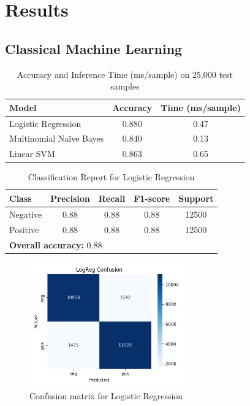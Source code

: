 \documentclass[12pt,a4paper]{article}
\begin{document}
\section{Results}
\subsection{Classical Machine Learning}

\begin{table}[H]
  \centering
  \caption{Accuracy and Inference Time (ms/sample) on 25,000 test samples}
  \label{tab:classical-summary}
  \begin{tabular}{lcc}
    \toprule
    \textbf{Model}          & \textbf{Accuracy} & \textbf{Time (ms/sample)} \\
    \midrule
    Logistic Regression     & 0.880             & 0.47                     \\
    Multinomial Naïve Bayes & 0.840             & 0.13                     \\
    Linear SVM              & 0.863             & 0.65                     \\
    \bottomrule
  \end{tabular}
\end{table}

\begin{table}[H]
  \centering
  \caption{Classification Report for Logistic Regression}
  \begin{tabular}{lcccc}
    \toprule
    \textbf{Class} & \textbf{Precision} & \textbf{Recall} & \textbf{F1-score} & \textbf{Support} \\
    \midrule
    Negative & 0.88 & 0.88 & 0.88 & 12500 \\
    Positive & 0.88 & 0.88 & 0.88 & 12500 \\
    \midrule
    \multicolumn{5}{l}{\textbf{Overall accuracy:} 0.88} \\
    \bottomrule
  \end{tabular}
\end{table}

\begin{figure}[H]
  \centering
  \includegraphics[width=0.6\textwidth]{figures/LogReg_confusion.png}
  \caption{Confusion matrix for Logistic Regression}
\end{figure}
\end{document}
